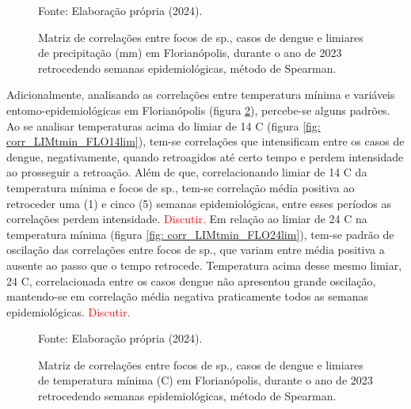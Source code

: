 \documentclass[
	12pt,				%
	openright,			%
	oneside,			%
	a4paper,			%
	english,			%
	french,				%
	spanish,			%
	brazil				%
	dvipsnames, table]{abntex2}
\begin{document}
\begin{figure}[htbp]
    \begin{center}
    \caption{Matriz de correlações entre focos de  sp., casos de dengue e limiares de precipitação (mm) em Florianópolis, durante o ano de 2023 retrocedendo semanas epidemiológicas, método de Spearman.}
    \label{fig: matriz_corr_LIMprec_FLO}
        \hfill
    \end{center}
    \small{Fonte: Elaboração própria (2024).}
\end{figure}

\indent Adicionalmente, analisando as correlações entre temperatura mínima e variáveis entomo-epidemiológicas em Florianópolis (figura \ref{fig: matriz_corr_LIMtmin_FLO}), percebe-se alguns padrões. Ao se analisar temperaturas acima do limiar de 14 C (figura \ref{fig: corr_LIMtmin_FLO14lim}), tem-se correlações que intensificam entre os casos de dengue, negativamente, quando retroagidos até certo tempo e perdem intensidade ao prosseguir a retroação. Além de que, correlacionando limiar de 14 C da temperatura mínima e focos de  sp., tem-se correlação média positiva ao retroceder uma (1) e cinco (5) semanas epidemiológicas, entre esses períodos as correlações perdem intensidade. \textcolor{red}{Discutir.} Em relação ao limiar de 24 C na temperatura mínima (figura \ref{fig: corr_LIMtmin_FLO24lim}), tem-se padrão de oscilação das correlações entre focos de  sp., que variam entre média positiva a ausente ao passo que o tempo retrocede. Temperatura acima desse mesmo limiar, 24 C, correlacionada entre os casos dengue não apresentou grande oscilação, mantendo-se em correlação média negativa praticamente todos as semanas epidemiológicas. \textcolor{red}{Discutir.}

\begin{figure}[htbp]
    \begin{center}
    \caption{Matriz de correlações entre focos de  sp., casos de dengue e limiares de temperatura mínima (C) em Florianópolis, durante o ano de 2023 retrocedendo semanas epidemiológicas, método de Spearman.}
    \label{fig: matriz_corr_LIMtmin_FLO}
        \hfill
    \end{center}
    \small{Fonte: Elaboração própria (2024).}
\end{figure}
\end{document}

